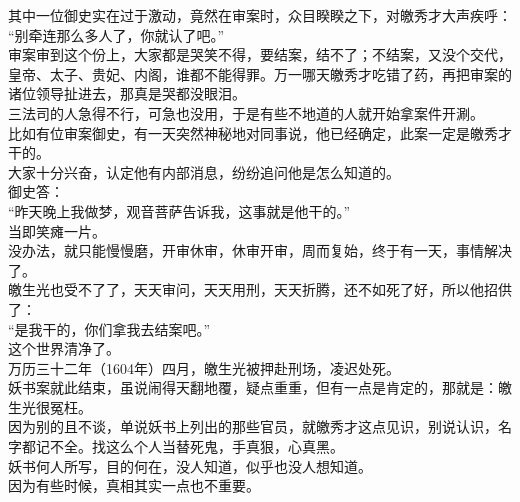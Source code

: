 \begin{multicols}{\theparacolNo}
其中一位御史实在过于激动，竟然在审案时，众目睽睽之下，对皦秀才大声疾呼：\\

“别牵连那么多人了，你就认了吧。”\\

审案审到这个份上，大家都是哭笑不得，要结案，结不了；不结案，又没个交代，皇帝、太子、贵妃、内阁，谁都不能得罪。万一哪天皦秀才吃错了药，再把审案的诸位领导扯进去，那真是哭都没眼泪。\\

三法司的人急得不行，可急也没用，于是有些不地道的人就开始拿案件开涮。\\

比如有位审案御史，有一天突然神秘地对同事说，他已经确定，此案一定是皦秀才干的。\\

大家十分兴奋，认定他有内部消息，纷纷追问他是怎么知道的。\\

御史答：\\

“昨天晚上我做梦，观音菩萨告诉我，这事就是他干的。”\\

当即笑瘫一片。\\

没办法，就只能慢慢磨，开审休审，休审开审，周而复始，终于有一天，事情解决了。\\

皦生光也受不了了，天天审问，天天用刑，天天折腾，还不如死了好，所以他招供了：\\

“是我干的，你们拿我去结案吧。”\\

这个世界清净了。\\

万历三十二年（1604年）四月，皦生光被押赴刑场，凌迟处死。\\

妖书案就此结束，虽说闹得天翻地覆，疑点重重，但有一点是肯定的，那就是：皦生光很冤枉。\\

因为别的且不谈，单说妖书上列出的那些官员，就皦秀才这点见识，别说认识，名字都记不全。找这么个人当替死鬼，手真狠，心真黑。\\

妖书何人所写，目的何在，没人知道，似乎也没人想知道。\\

因为有些时候，真相其实一点也不重要。\\


\end{multicols}
